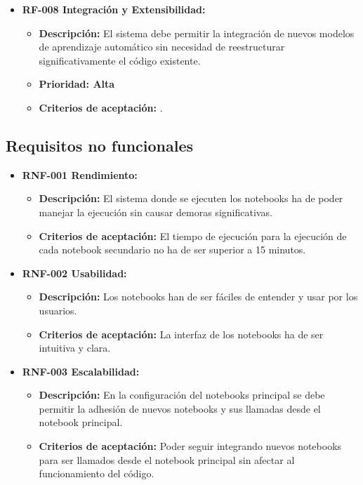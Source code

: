 \begin{itemize}
\item
  \textbf{RF-008 Integración y Extensibilidad:}

  \begin{itemize}
  \tightlist
  \item
   \textbf{Descripción:} El sistema debe permitir la integración de nuevos modelos de aprendizaje automático sin necesidad de reestructurar significativamente el código existente.
  \item  
   \textbf{Prioridad: Alta}
  \item  
   \textbf{Criterios de aceptación:} .
  \end{itemize}


\end{itemize}


\subsection{Requisitos no funcionales}

\begin{itemize}
\tightlist
\item
  \textbf{RNF-001 Rendimiento:}
 
  \begin{itemize}
  \tightlist
  \item
   \textbf{Descripción:} El sistema donde se ejecuten los notebooks ha de poder manejar la ejecución sin causar demoras significativas.
  \item
   \textbf{Criterios de aceptación:} El tiempo de ejecución para la ejecución de cada notebook secundario no ha de ser superior a 15 minutos.
  \end{itemize}


\item
  \textbf{RNF-002 Usabilidad:}
  
  \begin{itemize}
  \tightlist
  \item
    \textbf{Descripción:} Los notebooks han de ser fáciles de entender y usar por los usuarios.
  \item
   \textbf{Criterios de aceptación:} La interfaz de los notebooks ha de ser intuitiva y clara.
  \end{itemize}
 
  
\item
  \textbf{RNF-003 Escalabilidad:}

  \begin{itemize}
  \tightlist
  \item
    \textbf{Descripción:} En la configuración del notebooks principal se debe permitir la adhesión de nuevos notebooks y sus llamadas desde el notebook principal.
  \item
    \textbf{Criterios de aceptación:} Poder seguir integrando nuevos notebooks para ser llamados desde el notebook principal sin afectar al funcionamiento del código. 
  \end{itemize}

\end{itemize}


